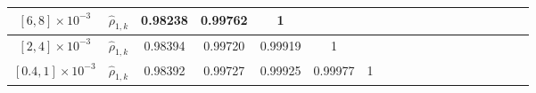 \begin{table}[ht]
{\begin{tabular}{|c|c|c|c|c|c|c|c|c|c|c|c|c|c|c|c|c|c|c|}
\multirow{1}{*}{$[6, 8]\times 10^{-3}$}&\multicolumn{1}{|c|}{$\widehat \rho_{1,k}$}&0.98238&0.99762&1&\multicolumn{3}{c|}{}\\
\hline
\multirow{1}{*}{$[2,4]\times 10^{-3}$}&\multicolumn{1}{|c|}{$\widehat \rho_{1,k}$}&0.98394&0.99720 &0.99919&1&\multicolumn{2}{c|}{}\\
\hline
\multirow{1}{*}{$[0.4,1]\times 10^{-3}$} &\multicolumn{1}{|c|}{$\widehat \rho_{1,k}$}&0.98392 &0.99727 &0.99925 &0.99977&1 &\\
\hline

\end{tabular}}
\end{table}
